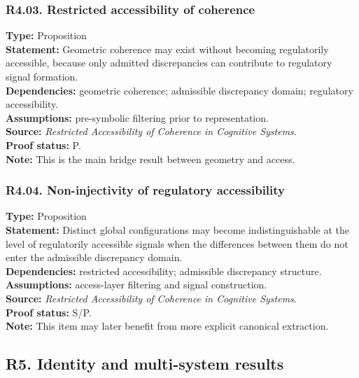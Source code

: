 \documentclass[12pt]{article}
\begin{document}
	\subsubsection*{R4.03. Restricted accessibility of coherence}
	\textbf{Type:} Proposition \\
	\textbf{Statement:} Geometric coherence may exist without becoming regulatorily accessible,
	because only admitted discrepancies can contribute to regulatory signal formation. \\
	\textbf{Dependencies:} geometric coherence; admissible discrepancy domain; regulatory accessibility. \\
	\textbf{Assumptions:} pre-symbolic filtering prior to representation. \\
	\textbf{Source:} \emph{Restricted Accessibility of Coherence in Cognitive Systems}. \\
	\textbf{Proof status:} P. \\
	\textbf{Note:} This is the main bridge result between geometry and access.
	
	\subsubsection*{R4.04. Non-injectivity of regulatory accessibility}
	\textbf{Type:} Proposition \\
	\textbf{Statement:} Distinct global configurations may become indistinguishable at the level of
	regulatorily accessible signals when the differences between them do not enter the admissible
	discrepancy domain. \\
	\textbf{Dependencies:} restricted accessibility; admissible discrepancy structure. \\
	\textbf{Assumptions:} access-layer filtering and signal construction. \\
	\textbf{Source:} \emph{Restricted Accessibility of Coherence in Cognitive Systems}. \\
	\textbf{Proof status:} S/P. \\
	\textbf{Note:} This item may later benefit from more explicit canonical extraction.
	
	\subsection{R5. Identity and multi-system results}
	
\end{document}
